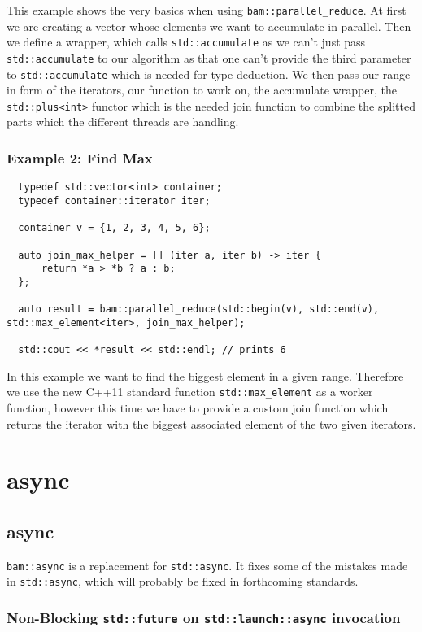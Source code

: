 \documentclass[11pt, a4paper]{article}
\begin{document}
This example shows the very basics when using \texttt{bam::parallel\_reduce}. At first we are creating a vector whose elements we want to accumulate in parallel. Then we define a wrapper, which calls \texttt{std::accumulate} as we can't just pass \texttt{std::accumulate} to our algorithm as that one can't provide the third parameter to \texttt{std::accumulate} which is needed for type deduction. We then pass our range in form of the iterators, our function to work on, the accumulate wrapper, the \texttt{std::plus<int>} functor which is the needed join function to combine the splitted parts which the different threads are handling. 

\subsubsection{Example 2: Find Max}
\begin{lstlisting}
  typedef std::vector<int> container;
  typedef container::iterator iter;

  container v = {1, 2, 3, 4, 5, 6};

  auto join_max_helper = [] (iter a, iter b) -> iter {
      return *a > *b ? a : b;
  };

  auto result = bam::parallel_reduce(std::begin(v), std::end(v), std::max_element<iter>, join_max_helper);

  std::cout << *result << std::endl; // prints 6
\end{lstlisting}

In this example we want to find the biggest element in a given range. Therefore we use the new C++11 standard function \texttt{std::max\_element} as a worker function, however this time we have to provide a custom join function which returns the iterator with the biggest associated element of the two given iterators.

\section{async}
\subsection{async}
\texttt{bam::async} is a replacement for \texttt{std::async}. It fixes some of the mistakes made in \texttt{std::async}, which will probably be fixed in forthcoming standards. 

\subsubsection{ Non-Blocking \texttt{std::future} on \texttt{std::launch::async} invocation }
\end{document}
